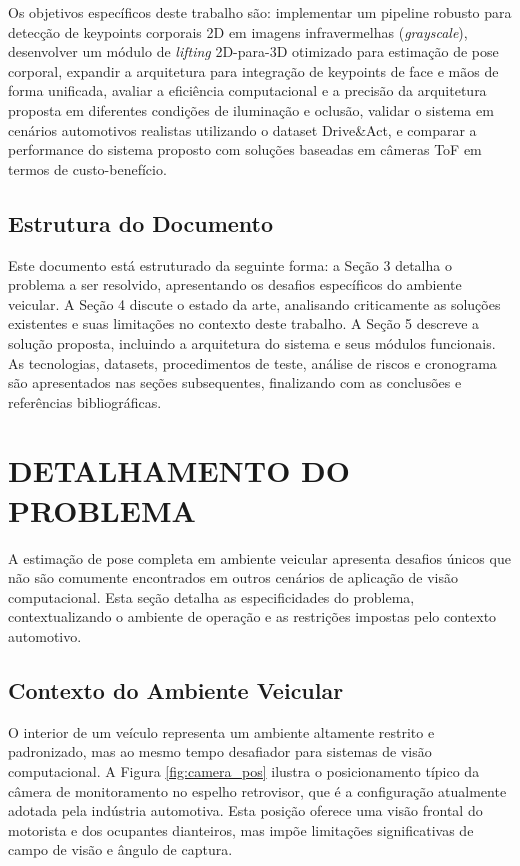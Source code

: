 \documentclass[12pt, a4paper]{article}
\begin{document}
Os objetivos específicos deste trabalho são: implementar um pipeline robusto para detecção de keypoints corporais 2D em imagens infravermelhas (\textit{grayscale}), desenvolver um módulo de \textit{lifting} 2D-para-3D otimizado para estimação de pose corporal, expandir a arquitetura para integração de keypoints de face e mãos de forma unificada, avaliar a eficiência computacional e a precisão da arquitetura proposta em diferentes condições de iluminação e oclusão, validar o sistema em cenários automotivos realistas utilizando o dataset Drive\&Act, e comparar a performance do sistema proposto com soluções baseadas em câmeras ToF em termos de custo-benefício.

\subsection{Estrutura do Documento}

Este documento está estruturado da seguinte forma: a Seção 3 detalha o problema a ser resolvido, apresentando os desafios específicos do ambiente veicular. A Seção 4 discute o estado da arte, analisando criticamente as soluções existentes e suas limitações no contexto deste trabalho. A Seção 5 descreve a solução proposta, incluindo a arquitetura do sistema e seus módulos funcionais. As tecnologias, datasets, procedimentos de teste, análise de riscos e cronograma são apresentados nas seções subsequentes, finalizando com as conclusões e referências bibliográficas.

\section{DETALHAMENTO DO PROBLEMA}
\label{sec:problema}

A estimação de pose completa em ambiente veicular apresenta desafios únicos que não são comumente encontrados em outros cenários de aplicação de visão computacional. Esta seção detalha as especificidades do problema, contextualizando o ambiente de operação e as restrições impostas pelo contexto automotivo.

\subsection{Contexto do Ambiente Veicular}

O interior de um veículo representa um ambiente altamente restrito e padronizado, mas ao mesmo tempo desafiador para sistemas de visão computacional. A Figura \ref{fig:camera_pos} ilustra o posicionamento típico da câmera de monitoramento no espelho retrovisor, que é a configuração atualmente adotada pela indústria automotiva. Esta posição oferece uma visão frontal do motorista e dos ocupantes dianteiros, mas impõe limitações significativas de campo de visão e ângulo de captura.
\end{document}
